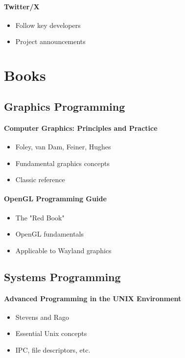 \paragraph{Twitter/X}
\begin{itemize}
    \item Follow key developers
    \item Project announcements
\end{itemize}

\section{Books}

\subsection{Graphics Programming}

\paragraph{Computer Graphics: Principles and Practice}
\begin{itemize}
    \item Foley, van Dam, Feiner, Hughes
    \item Fundamental graphics concepts
    \item Classic reference
\end{itemize}

\paragraph{OpenGL Programming Guide}
\begin{itemize}
    \item The "Red Book"
    \item OpenGL fundamentals
    \item Applicable to Wayland graphics
\end{itemize}

\subsection{Systems Programming}

\paragraph{Advanced Programming in the UNIX Environment}
\begin{itemize}
    \item Stevens and Rago
    \item Essential Unix concepts
    \item IPC, file descriptors, etc.
\end{itemize}

